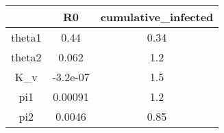 \begin{tabular}{|c|c|c|}
\hline
& R0 & cumulative_infected \\
\hline
theta1 & 0.44 & 0.34 \\
\hline
theta2 & 0.062 & 1.2 \\
\hline
K_v & -3.2e-07 & 1.5 \\
\hline
pi1 & 0.00091 & 1.2 \\
\hline
pi2 & 0.0046 & 0.85 \\
\hline
\end{tabular}
